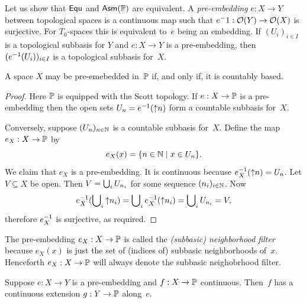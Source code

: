 Let us show that $\mathsf{Equ}$ and $\mathsf{Asm}(\mathbb{P})$ are equivalent. A
\emph{pre-embedding} $e : X \to Y$ between topological spaces is a
continuous map such that ${e}^-1 : \mathcal{O}(Y) \to \mathcal{O}(X)$ is
surjective. For $T_0$-spaces this is equivalent to~$e$ being an
embedding. If $(U_i)_{i \in I}$ is a topological subbasis for $Y$ and
$e : X \to Y$ is a pre-embedding, then $(e^{-1}(U_i))_{i \in I}$ is
a topological subbasis for~$X$.

\begin{theorem}
  \label{thm:scott-embedding}%
  A space $X$ may be pre-emebedded in~$\mathbb{P}$ if, and only if, it is
  countably based.
\end{theorem}

\begin{proof}
  Here $\mathbb{P}$ is equipped with the Scott topology. If $e : X \to
  \mathbb{P}$ is a pre-embedding then the open sets $U_n =
  e^{-1}({\uparrow}n)$ form a countable subbasis for~$X$.

  Conversely, suppose $(U_n)_{n \in \mathbb{N}}$ is a countable subbasis
  for~$X$. Define the map $e_X : X \to \mathbb{P}$ by
  \begin{equation*}
    e_X(x) = \{n \in \mathbb{N} \mid x \in U_n\}.
  \end{equation*}
  We claim that $e_X$ is a pre-embedding. It is continuous because
  $e_X^{-1}({\uparrow}n) = U_n$. Let $V \subseteq X$ be open. Then $V =
  \bigcup\nolimits_i U_{n_i}$ for some sequence $(n_i)_{i \in \mathbb{N}}$. Now
  \begin{equation*}
    e_X^{-1}(\bigcup\nolimits_i {\uparrow}n_i) =
      \bigcup\nolimits_i e_X^{-1}({\uparrow}n_i) =
      \bigcup\nolimits_i U_{n_i} = V,
  \end{equation*}
  therefore $e_X^{-1}$ is surjective, as required.
\end{proof}

\noindent
%
The pre-embedding $e_X : X \to \mathbb{P}$ is called the \emph{(subbasic)
  neighborhood filter} because $e_X(x)$ is just the set of (indices
of) subbasic neighborhoods of~$x$. Henceforth $e_X : X \to \mathbb{P}$
will always denote the subbasic neighobrhood filter.

\begin{theorem}
  \label{thm:scott-extension}%
  Suppose $e : X \to Y$ is a pre-embedding and $f : X \to \mathbb{P}$
  continuous. Then~$f$ has a continuous extension $g : Y \to \mathbb{P}$
  along~$e$.
\end{theorem}

